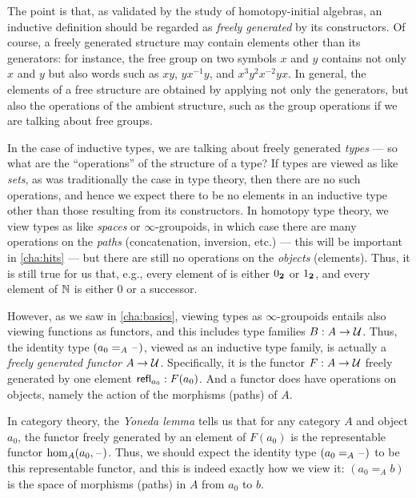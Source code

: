 %
%
The point is that, as validated by the study of homotopy-initial algebras, an inductive definition should be regarded as \emph{freely generated} by its constructors.
Of course, a freely generated structure may contain elements other than its generators: for instance, the free group on two symbols $x$ and $y$ contains not only $x$ and $y$ but also words such as $xy$, $yx^{-1}y$, and $x^3y^2x^{-2}yx$.
In general, the elements of a free structure are obtained by applying not only the generators, but also the operations of the ambient structure, such as the group operations if we are talking about free groups.

In the case of inductive types, we are talking about freely generated \emph{types} --- so what are the ``operations'' of the structure of a type?
If types are viewed as like \emph{sets}, as was traditionally the case in type theory, then there are no such operations, and hence we expect there to be no elements in an inductive type other than those resulting from its constructors.
In homotopy type theory, we view types as like \emph{spaces} or $\infty$-groupoids,%
in which case there are many operations on the \emph{paths} (concatenation, inversion, etc.) --- this will be important in \autoref{cha:hits} --- but there are still no operations on the \emph{objects} (elements).
Thus, it is still true for us that, e.g., every element of \bool is either ${0_{\mathbf{2}}}$ or ${1_{\mathbf{2}}}$, and every element of $\mathbb{N}$ is either $0$ or a successor.

However, as we saw in \autoref{cha:basics}, viewing types as $\infty$-groupoids entails also viewing functions as functors, and this includes type families $B:A\to\mathcal{U}$.
Thus, the identity type $(a_0 =_A \mathord{\hspace{1pt}\text{--}\hspace{1pt}})$, viewed as an inductive type family, is actually a \emph{freely generated functor} $A\to\mathcal{U}$.
Specifically, it is the functor $F:A\to\mathcal{U}$ freely generated by one element $\mathsf{refl}_{a_0}: F(a_0)$.
And a functor does have operations on objects, namely the action of the morphisms (paths) of $A$.

In category theory, the \emph{Yoneda lemma} tells us that for any category $A$ and object $a_0$, the functor freely generated by an element of $F(a_0)$ is the representable functor $\hom_A(a_0,\mathord{\hspace{1pt}\text{--}\hspace{1pt}})$.
Thus, we should expect the identity type $(a_0 =_A \mathord{\hspace{1pt}\text{--}\hspace{1pt}})$ to be this representable functor, and this is indeed exactly how we view it: $(a_0 =_A b)$ is the space of morphisms (paths) in $A$ from $a_0$ to $b$.

